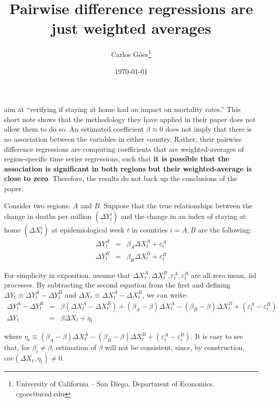 \documentclass{article}
\title{Pairwise difference regressions are just weighted averages}
\author{Carlos Góes\footnote{University of California -- San Diego, Department of Economics. cgoes@ucsd.edu}}
\date{\today}
\theoremstyle{lemma}
\begin{document}
\maketitle

\textcite{savaris_stay-at-home_2021} aim at ``verifying if staying at home had an impact on mortality rates.'' This short note shows that the methodology they have applied in their paper does not allow them to do so. An estimated coefficient $\beta \approx 0$ does not imply that there is no association between the variables in either country. Rather, their pairwise difference regressions are computing coefficients that are weighted-averages of region-specific time series regressions, such that \textbf{it is possible that the association is significant in both regions but their weighted-average is close to zero}. Therefore, the results do not back up the conclusions of the paper. 

Consider two regions: $A$ and $B$. Suppose that the true relationships between the change in deaths per million $(\Delta Y_t^i)$ and the change in an index of staying at home $(\Delta X_t^i)$ at epidemiological week $t$ in countries $i=A,B$ are the following:
\begin{eqnarray*}
    \Delta Y_t^A &=& \beta_A \Delta X_t^A + \varepsilon_t^A \\
    \Delta Y_t^B &=& \beta_B \Delta X_t^B + \varepsilon_t^B
\end{eqnarray*}

For simplicity in exposition, assume that $\Delta X_t^A, \Delta X_t^B, \varepsilon_t^A, \varepsilon_t^B$ are all zero mean, iid processes. By subtracting the second equation from the first and defining $\Delta Y_t \equiv \Delta Y_t^A - \Delta Y_t^B$ and $\Delta X_t \equiv \Delta X_t^A - \Delta X_t^B$, we can write:
\begin{eqnarray}\label{eq: model}
    \Delta Y_t^A - \Delta Y_t^B &=& \beta ( \Delta X_t^A - \Delta X_t^B) + (\beta_A - \beta) \Delta X_t^A - (\beta_B-\beta) \Delta X_t^B +  (\varepsilon_t^A - \varepsilon_t^B) \nonumber \\
     \Delta Y_t &=& \beta \Delta X_t + \eta_t
\end{eqnarray}

\noindent where $\eta_t \equiv (\beta_A - \beta) \Delta X_t^A - (\beta_B-\beta) \Delta X_t^B +  (\varepsilon_t^A - \varepsilon_t^B)$. It is easy to see that, for $\beta_i \neq \beta$, estimation of $\beta$ will not be consistent, since, by construction, $cov(\Delta X_t,\eta_t) \neq 0$.
\end{document}
